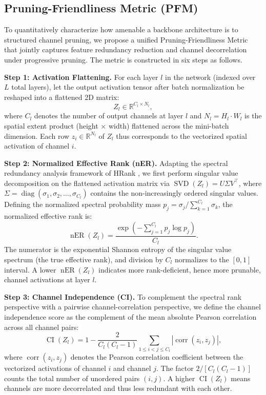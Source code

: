 \documentclass[conference]{IEEEtran}
\begin{document}
\subsection{Pruning-Friendliness Metric (PFM)}
To quantitatively characterize how amenable a backbone architecture is to structured channel pruning, we propose a unified Pruning-Friendliness Metric that jointly captures feature redundancy reduction and channel decorrelation under progressive pruning. The metric is constructed in six steps as follows.

\textbf{Step 1: Activation Flattening.} For each layer $l$ in the network (indexed over $L$ total layers), let the output activation tensor after batch normalization be reshaped into a flattened 2D matrix:
\begin{equation}
Z_l \in \mathbb{R}^{C_l \times N_l},
\end{equation}
where $C_l$ denotes the number of output channels at layer $l$ and $N_l = H_l \cdot W_l$ is the spatial extent product (height $\times$ width) flattened across the mini-batch dimension. Each row $z_i \in \mathbb{R}^{N_l}$ of $Z_l$ thus corresponds to the vectorized spatial activation of channel $i$.

\textbf{Step 2: Normalized Effective Rank (nER).} Adapting the spectral redundancy analysis framework of HRank \cite{lin2020hrank}, we first perform singular value decomposition on the flattened activation matrix via $\operatorname{SVD}(Z_l) = U \Sigma V^\top$, where $\Sigma = \operatorname{diag}(\sigma_1, \sigma_2, \ldots, \sigma_{C_l})$ contains the non-increasingly ordered singular values. Defining the normalized spectral probability mass $p_j = \sigma_j / \sum_{k=1}^{C_l} \sigma_k$, the normalized effective rank is:
\begin{equation}
\operatorname{nER}(Z_l) = \frac{\exp\left(-\sum_{j=1}^{C_l} p_j \log p_j\right)}{C_l}.
\end{equation}
The numerator is the exponential Shannon entropy of the singular value spectrum (the true effective rank), and division by $C_l$ normalizes to the $[0, 1]$ interval. A lower $\operatorname{nER}(Z_l)$ indicates more rank-deficient, hence more prunable, channel activations at layer $l$.

\textbf{Step 3: Channel Independence (CI).} To complement the spectral rank perspective with a pairwise channel-correlation perspective, we define the channel independence score as the complement of the mean absolute Pearson correlation across all channel pairs:
\begin{equation}
\operatorname{CI}(Z_l) = 1 - \frac{2}{C_l(C_l - 1)} \sum_{1 \leq i < j \leq C_l} \left| \operatorname{corr}(z_i, z_j) \right|,
\end{equation}
where $\operatorname{corr}(z_i, z_j)$ denotes the Pearson correlation coefficient between the vectorized activations of channel $i$ and channel $j$. The factor $2/[C_l(C_l-1)]$ counts the total number of unordered pairs $(i,j)$. A higher $\operatorname{CI}(Z_l)$ means channels are more decorrelated and thus less redundant with each other.
\end{document}
